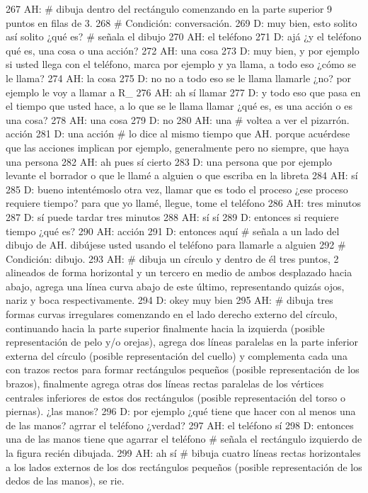 267 AH: # dibuja dentro del rectángulo comenzando en la parte superior 9 puntos en filas de 3.
268 # Condición: conversación.
269 D: muy bien, esto solito así solito ¿qué es? # señala el dibujo
270 AH: el teléfono
271 D: ajá ¿y el teléfono qué es, una cosa o una acción?
272 AH: una cosa
273 D: muy bien, y por ejemplo si usted llega con el teléfono, marca por ejemplo y ya llama, a todo eso ¿cómo se le llama?
274 AH: la cosa
275 D: no no a todo eso se le llama llamarle ¿no? por ejemplo le voy a llamar a R_
276 AH: ah sí llamar
277 D: y todo eso que pasa en el tiempo que usted hace, a lo que se le llama llamar ¿qué es, es una acción o es una cosa?
278 AH: una cosa
279 D: no
280 AH: una # voltea a ver el pizarrón. acción
281 D: una acción # lo dice al mismo tiempo que AH. porque acuérdese que las acciones implican por ejemplo, generalmente pero no siempre, que haya una persona
282 AH: ah pues sí cierto
283 D: una persona que por ejemplo levante el borrador o que le llamé a alguien o que escriba en la libreta
284 AH: sí
285 D: bueno intentémoslo otra vez, llamar que es todo el proceso ¿ese proceso requiere tiempo? para que yo llamé, llegue, tome el teléfono
286 AH: tres minutos
287 D: sí puede tardar tres minutos
288 AH: sí sí
289 D: entonces si requiere tiempo ¿qué es?
290 AH: acción
291 D: entonces aquí # señala a un lado del dibujo de AH. dibújese usted usando el teléfono para llamarle a alguien
292 # Condición: dibujo.
293 AH: # dibuja un círculo y dentro de él tres puntos, 2 alineados de forma horizontal y un tercero en medio de ambos desplazado hacia abajo, agrega una línea curva abajo de este último, representando quizás ojos, nariz y boca respectivamente.
294 D: okey muy bien
295 AH: # dibuja tres formas curvas irregulares comenzando en el lado derecho externo del círculo, continuando hacia la parte superior  finalmente hacia la izquierda (posible representación de pelo y/o orejas), agrega dos líneas paralelas en la parte inferior externa del círculo (posible representación del cuello) y complementa cada una con trazos rectos para formar rectángulos pequeños (posible representación de los brazos), finalmente agrega otras dos líneas rectas paralelas de los vértices centrales inferiores de estos dos rectángulos (posible representación del torso o piernas). ¿las manos?
296 D: por ejemplo ¿qué tiene que hacer con al menos una de las manos? agrrar el teléfono ¿verdad?
297 AH: el teléfono sí
298 D: entonces una de las manos tiene que agarrar el teléfono # señala el rectángulo izquierdo de la figura recién dibujada.
299 AH: ah sí # bibuja cuatro líneas rectas horizontales a los lados externos de los dos rectángulos pequeños (posible representación de los dedos de las manos), se rie.
